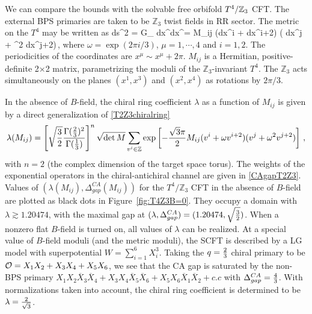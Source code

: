 \documentclass[12pt]{article}
\begin{document}
We can compare the bounds with the solvable free orbifold $T^4 / \mathbb{Z}_3$ CFT. The external BPS primaries are taken to be $\mathbb{Z}_3$ twist fields in RR sector.  The metric on the $T^4$ may be written as
\ie
ds^2 = G_{\mu \nu} dx^\mu dx^\nu = M_{ij} (dx^i  +  \omega dx^{i+2}) ( dx^j + \omega^2 dx^{j+2})\,,
\fe
where $\omega= \exp(2\pi i /3)$, $\mu=1,\cdots, 4$ and $i=1,2$.  The periodicities of the coordinates are $x^\mu \sim x^\mu +2\pi$.  $M_{ij}$ is a Hermitian, positive-definite 2$\times$2 matrix, parametrizing the moduli of the $\mathbb{Z}_3$-invariant $T^4$. The $\mathbb{Z}_3$ acts simultaneously on the planes $(x^1,x^3)$ and $(x^2,x^4)$ as rotations by $2\pi /3$.   

In the absence of $B$-field, the chiral ring coefficient $\lambda$ as a function of $M_{ij}$ is given by a direct generalization of \eqref{T2Z3chiralring} 
\begin{align}\label{T4Z3chiralring}
\lambda(M_{ij})   =  \left[\sqrt{3\over 2} {\Gamma(\frac 23)^2 \over \Gamma(\frac13)}\right]^n \sqrt{\det M} \sum_{v^i\in \mathbb{Z}} \exp\left[   - {\sqrt{3} \pi  \over 2 }M_{ij} (v^i + \omega v^{i+2})(v^j + \omega^2 v^{j+2})\right]\,,
\end{align}
with $n=2$ (the complex dimension of the target space torus). 
The weights of the exponential operators in the chiral-antichiral channel are given in \eqref{CAgapT2Z3}.  Values of $(\lambda(M_{ij}) ,\Delta^{CA}_{gap}(M_{ij}))$ for the $T^4/\mathbb{Z}_3$ CFT in the absence of $B$-field are plotted as black dots in Figure~\ref{fig:T4Z3B=0}. They occupy a domain with $\lambda\gtrsim 1.20474$, with the maximal gap at $(\lambda, \Delta^{CA}_{gap})= (1.20474, \sqrt{3\over2})$. When a nonzero flat $B$-field is turned on, all values of $\lambda$ can be realized. At a special value of $B$-field moduli (and the metric moduli), the SCFT is described by a LG model with superpotential $W=\sum_{i=1}^6 X_i^3$. Taking the $q={2\over 3}$ chiral primary to be ${\cal O}=X_1 X_2+X_3 X_4+X_5 X_6$, we see that the CA gap is saturated by the non-BPS primary $X_1 X_2 \overline X_3 \overline X_4 +X_3 X_4 \overline X_5 \overline X_6 +X_5 X_6 \overline X_1 \overline X_2 +c.c$ with $\Delta^{CA}_{gap}={4\over 3}$. With normalizations taken into account, the chiral ring coefficient is determined to be $\lambda={2\over \sqrt{3}}$.
\end{document}
